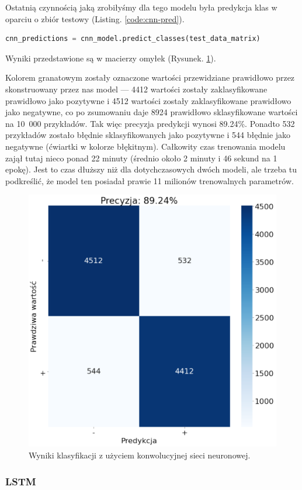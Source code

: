 \noindent Ostatnią czynnością jaką zrobiłyśmy dla tego modelu była predykcja klas w oparciu o zbiór testowy (Listing. \ref{code:cnn-pred}).

\begin{lstlisting}[language=Python,frame=single, breaklines=true, caption=Predykcja z użyciem modelu CNN.,label=code:cnn-pred]
cnn_predictions = cnn_model.predict_classes(test_data_matrix)
\end{lstlisting}

\noindent Wyniki przedstawione są w macierzy omyłek (Rysunek. \ref{fig:cnn-macierz}).

\noindent Kolorem granatowym zostały oznaczone wartości przewidziane prawidłowo przez skonstruowany przez nas model --- 4412 wartości zostały zaklasyfikowane prawidłowo jako pozytywne i 4512 wartości zostały zaklasyfikowane prawidłowo jako negatywne, co po zsumowaniu daje 8924 prawidłowo sklasyfikowane wartości na 10~000 przykładów. Tak więc precyzja predykcji wynosi 89.24\%. Ponadto 532 przykładów zostało błędnie sklasyfikowanych jako pozytywne i 544 błędnie jako negatywne (ćwiartki w kolorze błękitnym). Całkowity czas trenowania modelu zajął tutaj nieco ponad 22 minuty (średnio około 2 minuty i 46 sekund na 1 epokę). Jest to czas dłuższy niż dla dotychczasowych dwóch modeli, ale trzeba tu podkreślić, że model ten posiadał prawie 11 milionów trenowalnych parametrów.
\begin{figure}[H]
	\centering
	\includegraphics[width=0.5\linewidth]{images/chapter3/cnn-macierz.pdf}
	\caption{Wyniki klasyfikacji z użyciem konwolucyjnej sieci neuronowej.}
	\label{fig:cnn-macierz}
\end{figure}




\subsubsection{LSTM}

